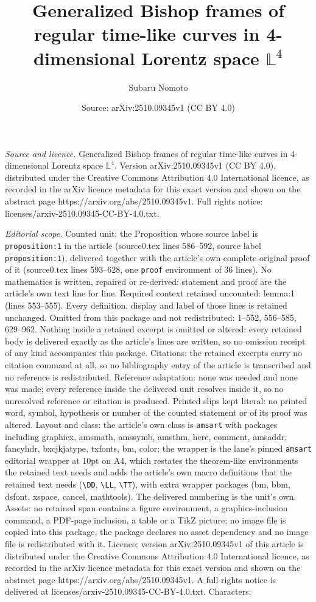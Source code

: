 \documentclass[10pt,a4paper]{amsart}
\title[Generalized Bishop frames of regular time-like curves in 4-d]{Generalized Bishop frames of regular time-like curves in 4-dimensional Lorentz space $\mathbb{L}^{4}$}
\author{Subaru Nomoto}
\date{Source: arXiv:2510.09345v1 (CC BY 4.0)}
\begin{document}
\maketitle

\noindent\emph{Source and licence.} Generalized Bishop frames of regular time-like curves in 4-dimensional Lorentz space $\mathbb{L}^{4}$. Version arXiv:2510.09345v1 (CC BY 4.0), distributed under the Creative Commons Attribution 4.0 International licence, as recorded in the arXiv licence metadata for this exact version and shown on the abstract page https://arxiv.org/abs/2510.09345v1. Full rights notice: licenses/arxiv-2510.09345-CC-BY-4.0.txt.\par\smallskip

\noindent\textit{Editorial scope.} Counted unit: the Proposition whose source label is \texttt{proposition:1} in the article (source0.tex lines 586--592, source label \texttt{proposition:1}), delivered together with the article's own complete original proof of it (source0.tex lines 593--628, one \texttt{proof} environment of 36 lines). No mathematics is written, repaired or re-derived: statement and proof are the article's own text line for line. Required context retained uncounted: lemma:1 (lines 553--555). Every definition, display and label of those lines is retained unchanged. Omitted from this package and not redistributed: 1--552, 556--585, 629--962. Nothing inside a retained excerpt is omitted or altered: every retained body is delivered exactly as the article's lines are written, so no omission receipt of any kind accompanies this package. Citations: the retained excerpts carry no citation command at all, so no bibliography entry of the article is transcribed and no reference is redistributed. Reference adaptation: none was needed and none was made; every reference inside the delivered unit resolves inside it, so no unresolved reference or citation is produced. Printed slips kept literal: no printed word, symbol, hypothesis or number of the counted statement or of its proof was altered. Layout and class: the article's own class is \texttt{amsart} with packages including graphicx, amsmath, amssymb, amsthm, here, comment, amsaddr, fancyhdr, bxcjkjatype, txfonts, bm, color; the wrapper is the lane's pinned \texttt{amsart} editorial wrapper at 10pt on A4, which restates the theorem-like environments the retained text needs and adds the article's own macro definitions that the retained text needs (\texttt{\textbackslash DD}, \texttt{\textbackslash LL}, \texttt{\textbackslash TT}), with extra wrapper packages (bm, bbm, dsfont, xspace, cancel, mathtools). The delivered numbering is the unit's own. Assets: no retained span contains a figure environment, a graphics-inclusion command, a PDF-page inclusion, a table or a TikZ picture; no image file is copied into this package, the package declares no asset dependency and no image file is redistributed with it. Licence: version arXiv:2510.09345v1 of this article is distributed under the Creative Commons Attribution 4.0 International licence, as recorded in the arXiv licence metadata for this exact version and shown on the abstract page https://arxiv.org/abs/2510.09345v1. A full rights notice is delivered at licenses/arxiv-2510.09345-CC-BY-4.0.txt. Characters: 
\end{document}
